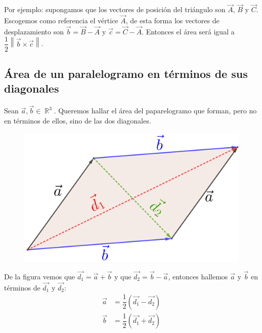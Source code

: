 \documentclass[12pt, fleqn]{report}                             %
\theoremstyle{break}                                            %
\DeclareMathOperator \Reals        {\mathbb{R}}                 %
\newcommand{\Wrap}[1]{\left( #1 \right)}                        %
\newcommand{\Abs}[1]{\left\lVert #1 \right\lVert}               %
\begin{document}
            Por ejemplo: supongamos que los vectores de posición del triángulo son $\vec{A}$, $\vec{B}$ y $\vec{C}$. Escogemos como referencia el vértice $\vec{A}$, de esta forma los vectores de desplazamiento son $\vec{b}=\vec{B}-\vec{A}$ y $\vec{c}=\vec{C}-\vec{A}$. Entonces el área será igual a $\dfrac{1}{2}\Abs{\vec{b} \times \vec{c}}$.
            
            \clearpage
            
            \subsection{Área de un paralelogramo en términos de sus diagonales}
            
            Sean $\vec{a}, \vec{b} \in \Reals^3$. Queremos hallar el área del paparelogramo que forman, pero no en términos de ellos, sino de las dos diagonales.
            
            \begin{figure}[H]
                \centering
                \includegraphics[scale=1.3]{parallelogram2.png}
            \end{figure}
            
            De la figura vemos que $\vec{d_1}=\vec{a}+\vec{b}$ y que $\vec{d_2}=\vec{b}-\vec{a}$, entonces hallemos $\vec{a}$ y $\vec{b}$ en términos de $\vec{d_1}$ y $\vec{d_2}$:
            \begin{align*}
                \vec{a} &= \dfrac{1}{2}\Wrap{\vec{d_1}-\vec{d_2}}\\
                \vec{b} &= \dfrac{1}{2}\Wrap{\vec{d_1}+\vec{d_2}}
            \end{align*}
            
\end{document}
